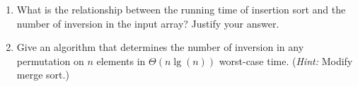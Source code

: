 \documentclass[Chapter02]{subfiles}
\begin{document}
\begin{enumerate}[leftmargin=\labelsep,label={\textbf{\thesection-\arabic*}}]
\begin{enumerate}
\begin{answer}
			\end{answer}
			
			\item What is the relationship between the running time of insertion sort and the number of inversion in the input array? Justify your answer.
			\begin{answer}
				
			\end{answer}
			
			\item Give an algorithm that determines the number of inversion in any permutation on $n$ elements in $\Theta(n \lg(n))$ worst-case time. (\emph{Hint:} Modify merge sort.)
			\begin{answer}
				
			\end{answer}
			
		\end{enumerate}
		
	\end{enumerate}
\end{document}
